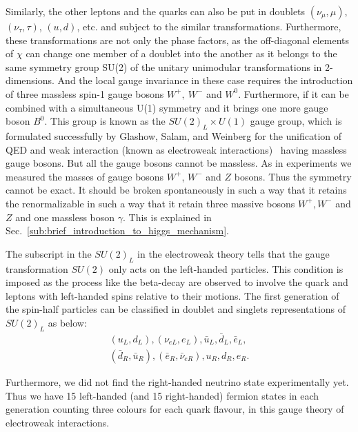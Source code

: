 


Similarly, the other leptons and the quarks can also be put in doublets $(\nu_\mu, \mu)$, $(\nu_\tau,\tau)$, $(u,d)$, etc. and subject to the similar transformations.
Furthermore, these transformations are not only the phase factors, as the off-diagonal elements of $\chi$ can change one member of a doublet into the another as it belongs to the same symmetry group SU(2) of the unitary unimodular transformations in 2-dimensions.
And the local gauge invariance in these case requires the introduction of three massless spin-1 gauge bosons $W^+,~W^-$ and $W^0$.
Furthermore, if it can be combined with a simultaneous U(1) symmetry and it brings one more gauge boson $B^0$. This group is known as the $SU(2)_L\times U(1)$ gauge group, which is formulated successfully by Glashow, Salam, and Weinberg for the unification of QED and weak interaction (known as electroweak interactions)~\cite{StandardModel67_2} having massless gauge bosons. But all the gauge bosons cannot be massless. As in experiments we measured the masses of gauge bosons $W^+$, $W^-$ and $Z$ bosons. Thus the symmetry cannot be exact. It should be broken spontaneously in such a way that it retains the renormalizable in such a way that it retain three massive bosons $W^+, W^-$ and $Z$ and one massless boson $\gamma$. This is explained in Sec.~\ref{sub:brief_introduction_to_higgs_mechanism}.

The subscript in the $SU(2)_L$ in the electroweak theory tells that the gauge transformation $SU(2)$ only acts on the left-handed particles. This condition is imposed as the process like the beta-decay are observed to involve the quark and leptons with left-handed spins relative to their motions. The first generation of the spin-half particles can be classified in doublet and singlets representations of $SU(2)_L$ as below:
\begin{eqnarray}
    (u_L,d_L),(\nu_{eL},e_L),\bar{u}_L,\bar{d}_L,\bar{e}_L, \nonumber \\
    (\bar{d}_R,\bar{u}_R),(\bar{e}_R,\bar{\nu}_{eR}),u_R,d_R,e_R.   \nonumber
\end{eqnarray}

Furthermore, we did not find the right-handed neutrino state experimentally yet.
Thus we have 15 left-handed (and 15 right-handed) fermion states in each generation counting three colours for each quark flavour, in this gauge theory of electroweak interactions.

